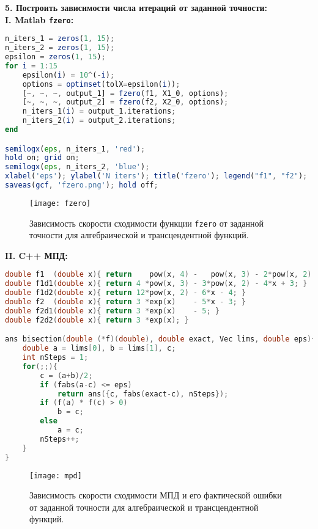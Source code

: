 \clearpage

{\Large{\textbf{5. Построить зависимости числа итераций от заданной точности:}}}\\
{\large\bf{I. Matlab \texttt{fzero}:}}
\begin{lstlisting}[language=Octave, firstnumber=15]
n_iters_1 = zeros(1, 15);
n_iters_2 = zeros(1, 15);
epsilon = zeros(1, 15);
for i = 1:15
    epsilon(i) = 10^(-i);
    options = optimset(tolX=epsilon(i));
    [~, ~, ~, output_1] = fzero(f1, X1_0, options);
    [~, ~, ~, output_2] = fzero(f2, X2_0, options);
    n_iters_1(i) = output_1.iterations;
    n_iters_2(i) = output_2.iterations;
end

semilogx(eps, n_iters_1, 'red');
hold on; grid on;
semilogx(eps, n_iters_2, 'blue');
xlabel('eps'); ylabel('N iters'); title('fzero'); legend("f1", "f2");
saveas(gcf, 'fzero.png'); hold off;
\end{lstlisting}
\begin{figure}[H]
    \centering
    \caption{Зависимость скорости сходимости функции \texttt{fzero} от заданной точности для алгебраической и трансцендентной функций.}
    \label{fig:pic3}
    \texttt{[image: fzero]}
\end{figure}

\clearpage

{\large\bf{II. C++ МПД:}}
\begin{lstlisting}[language=c++]
double f1  (double x){ return    pow(x, 4) -   pow(x, 3) - 2*pow(x, 2) + 3*x - 3; }
double f1d1(double x){ return 4 *pow(x, 3) - 3*pow(x, 2) - 4*x + 3; }
double f1d2(double x){ return 12*pow(x, 2) - 6*x - 4; }
double f2  (double x){ return 3 *exp(x)    - 5*x - 3; }
double f2d1(double x){ return 3 *exp(x)    - 5; }
double f2d2(double x){ return 3 *exp(x); }

ans bisection(double (*f)(double), double exact, Vec lims, double eps){
    double a = lims[0], b = lims[1], c;
    int nSteps = 1;
    for(;;){
        c = (a+b)/2;
        if (fabs(a-c) <= eps)
            return ans({c, fabs(exact-c), nSteps});
        if (f(a) * f(c) > 0)
            b = c;
        else
            a = c;
        nSteps++;
    }
}
\end{lstlisting}
\begin{figure}[H]
    \centering
    \caption{Зависимость скорости сходимости МПД и его фактической ошибки от заданной точности для алгебраической и трансцендентной функций.}
    \label{fig:pic4}
    \texttt{[image: mpd]}
\end{figure}

